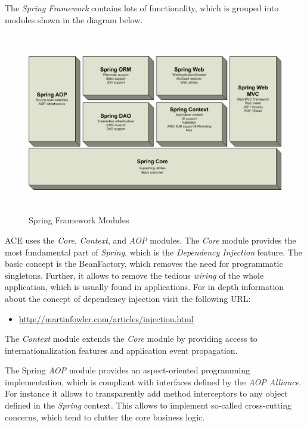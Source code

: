 The \emph{Spring Framework} contains lots of functionality, which is grouped
into modules shown in the diagram below.

\begin{figure}[H]
 \centering
 \includegraphics[width=15cm,height=7.9cm]{../images/finalreport/spring-overview.eps}
 \caption{Spring Framework Modules}
\end{figure}

ACE uses the \emph{Core}, \emph{Context}, and \emph{AOP} modules. The
\emph{Core} module provides the most fundamental part of \emph{Spring}, which
is the \emph{Dependency Injection} feature. The basic concept is the
BeanFactory, which removes the need for programmatic singletons. Further, it
allows to remove the tedious \emph{wiring} of the whole application, which
is usually found in applications. For in depth information about
the concept of dependency injection visit the following URL:

\begin{itemize}
 \item \href{http://martinfowler.com/articles/injection.html}{http://martinfowler.com/articles/injection.html}
\end{itemize}

The \emph{Context} module extends the \emph{Core} module by providing access
to internationalization features and application event propagation.

The Spring \emph{AOP} module provides an aspect-oriented programming 
implementation, which is compliant with interfaces defined by the 
\emph{AOP Alliance}. For instance it allows to transparently add method
interceptors to any object defined in the \emph{Spring} context. This allows
to implement so-called cross-cutting concerns, which tend to clutter the
core business logic.


